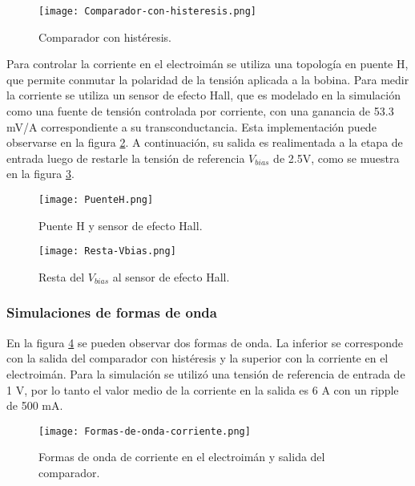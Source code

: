 \begin{figure}[H]
	\centering
	\texttt{[image: Comparador-con-histeresis.png]}
	\caption{Comparador con histéresis.}
	\label{fig:img_comp-con-hist}
\end{figure}

\noindent Para controlar la corriente en el electroimán se utiliza una topología en puente H, que permite conmutar la polaridad de la tensión aplicada a la bobina. Para medir la corriente se utiliza un sensor de efecto Hall, que es modelado en la simulación como  una fuente de tensión controlada por corriente, con una ganancia de 53.3 mV/A correspondiente a su transconductancia. Esta implementación puede observarse en la figura \ref{fig:img_puenteH}. A continuación, su salida es realimentada a la etapa de entrada luego de restarle la tensión de referencia  $V_{bias}$ de 2.5V, como se muestra en la figura \ref{fig:img_resta-Vbias}. 

\begin{figure}[H]
	\centering
	\texttt{[image: PuenteH.png]}
	\caption{Puente H y sensor de efecto Hall.}
	\label{fig:img_puenteH}
\end{figure}

\begin{figure}[H]
	\centering
	\texttt{[image: Resta-Vbias.png]}
	\caption{Resta del $V_{bias}$ al sensor de efecto Hall.}
	\label{fig:img_resta-Vbias}
\end{figure}

\subsubsection{Simulaciones de formas de onda}

\noindent En la figura \ref{fig:img_formas-de-onda-corriente} se pueden observar dos formas de onda. La inferior  se corresponde con la salida del comparador con histéresis y la superior con la corriente en el electroimán. Para la simulación se utilizó una tensión de referencia de entrada de 1 V, por lo tanto el valor medio de la corriente en la salida es 6 A con un ripple de 500 mA.

\begin{figure}[H]
	\centering
	\texttt{[image: Formas-de-onda-corriente.png]}
	\caption{Formas de onda de corriente en el electroimán y salida del comparador.}
	\label{fig:img_formas-de-onda-corriente}
\end{figure}



